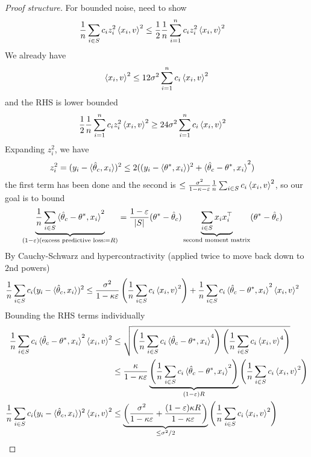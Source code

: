 \begin{proof}[Proof structure]
  For bounded noise, need to show
  \begin{align}
    \frac{1}{n} \sum_{i \in S} c_i z_i^2 \braket{x_i, v}^2
    &\leq \frac{1}{2} \frac{1}{n} \sum_{i=1}^n c_i z_i^2 \braket{x_i, v}^2
  \end{align}
  We already have
  \begin{align}
    \braket{x_i, v}^2 \leq 12 \sigma^2 \sum_{i=1}^n c_i \braket{x_i, v}^2
  \end{align}
  and the RHS is lower bounded
  \begin{align}
    \frac{1}{2} \frac{1}{n} \sum_{i=1}^n c_i z_i^2 \braket{x_i, v}^2
    &\geq 24 \sigma^2 \sum_{i=1}^n c_i \braket{x_i, v}^2
  \end{align}
  Expanding $z_i^2$, we have
  \begin{align}
    z_i^2
    &= (y_i - \braket{\hat{\theta}_c, x_i})^2 
    \leq 2 ((y_i - \braket{\theta^*, x_i})^2+ \braket{\hat\theta_c - \theta^*, x_i}^2)
  \end{align}
  the first term has been done and the second is $\leq \frac{\sigma^2}{1 - \kappa -\varepsilon} \frac{1}{n} \sum_{i \in S} c_i \braket{x_i, v}^2$,
  so our goal is to bound
  \begin{align}
    \underbrace{\frac{1}{n}  \sum_{i \in S} \braket{\hat\theta_c - \theta^*, x_i}^2}_{(1-\varepsilon) (\text{excess predictive loss} \coloneqq R)}
    &= \frac{1 - \varepsilon}{\lvert S \rvert} (\theta^* - \hat\theta_c) \underbrace{\sum_{i \in S} x_i x_i^\top}_{\text{second moment matrix}} (\theta^* - \hat\theta_c)
  \end{align}
  By Cauchy-Schwarz and hypercontractivity (applied twice to move back down to $2$nd powers)
  \begin{align}
    \frac{1}{n} \sum_{i \in S} c_i (y_i - \braket{\hat\theta_c, x_i})^2
    &\leq \frac{\sigma^2}{1 - \kappa \varepsilon} \left( \frac{1}{n} \sum_{i \in S} c_i \braket{x_i, v}^2 \right)
    + \frac{1}{n}  \sum_{i \in S} c_i \braket{\hat\theta_c - \theta^*, x_i}^2 \braket{x_i, v}^2
  \end{align}
  Bounding the RHS terms individually
  \begin{align}
    \frac{1}{n}  \sum_{i \in S} c_i \braket{\hat\theta_c - \theta^*, x_i}^2 \braket{x_i, v}^2
    &\leq \sqrt{
      \left(\frac{1}{n} \sum_{i \in S} c_i \braket{\hat\theta_c - \theta^*, x_i}^4\right)
      \left(\frac{1}{n} \sum_{i \in S} c_i \braket{x_i, v}^4\right)
    }\\
    &\leq \frac{\kappa}{1 - \kappa\varepsilon} 
    \underbrace{\left(\frac{1}{n} \sum_{i \in S} c_i \braket{\hat\theta_c - \theta^*, x_i}^2\right)}_{(1 - \varepsilon) R}
      \left(\frac{1}{n} \sum_{i \in S} c_i \braket{x_i, v}^2\right) \\
    \frac{1}{n} \sum_{i \in S} c_i (y_i - \braket{\hat\theta_c, x_i})^2 \braket{x_i, v}^2
    &\leq 
    \underbrace{\left( \frac{\sigma^2}{1 - \kappa \varepsilon} + \frac{(1 - \varepsilon) \kappa R}{1 - \kappa \varepsilon} \right)}_{\leq \sigma^2 / 2}
    \left( \frac{1}{n} \sum_{i \in S} c_i \braket{x_i, v}^2 \right)
  \end{align}


\end{proof}

